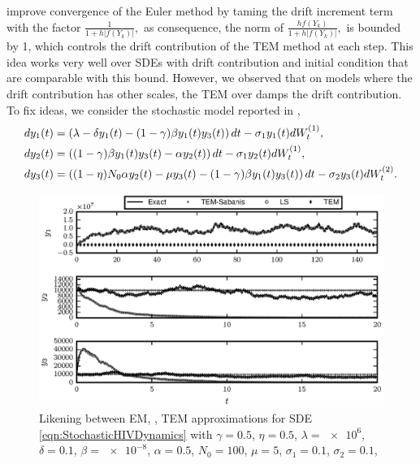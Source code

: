 \begin{example}
	\citeauthor{Hutzenthaler2012a} improve convergence of the Euler method by taming the drift increment term with 
	the factor
	$
		\frac{1}{1 + h |f(Y_k)|},
	$
	as consequence, the norm of  
	$
	\frac{h f(Y_k)}{1 + h |f(Y_k)|},
	$ is bounded by 1, which  controls the drift contribution of the TEM method at each step. This idea works very well
	over SDEs with drift contribution and initial condition that are comparable with this bound. However, we observed
	that on models where the	drift contribution has other scales, the TEM over damps the drift contribution. To fix
	ideas, we consider the	stochastic model reported in \cite{Dalal2008},
	\begin{align}\label{eqn:StochasticHIVDynamics}
		dy_1(t) &=
		\left(
			\lambda -\delta y_1(t) - (1 - \gamma) \beta y_1(t) y_3(t)
		\right)dt
		-\sigma_1 y_1(t) dW^{(1)}_t, 
		\notag \\
		dy_2(t) &= 	
		\left(
			(1- \gamma) \beta y_1(t) y_3(t) - \alpha y_2(t) 
		\right)dt
		-\sigma_1 y_2(t) dW^{(1)}_t, 
		\\
		dy_3(t) & = 
		\left(
			(1 - \eta) N_0 \alpha y_2(t) 
				-\mu y_3(t)
			-(1 - \gamma ) \beta y_1(t) y_3(t) 
		\right)dt
		- \sigma_2 y_3(t) dW^{(2)}_t.
		\notag
	\end{align}	
	\begin{figure}[h!]
		\centering
		\includegraphics{./papers/paperB/figures/InternalHIVDynamics}
		\caption{
			Likening between EM, \SM, TEM approximations for SDE \eqref{eqn:StochasticHIVDynamics} with
			$\gamma = \num{0.5}$,
			$\eta = \num{0.5}$,
			$\lambda = \num{e6}$, 
			$\delta = \num{0.1}$,
			$\beta = \num{e-8}$,
			$\alpha = \num{0.5}$,
			$N_0= \num{100}$,
			$\mu = \num{5}$,
			$\sigma_1 = \num{0.1}$,
			$\sigma_2 = \num{0.1} $,
}
\end{figure}
\end{example}
